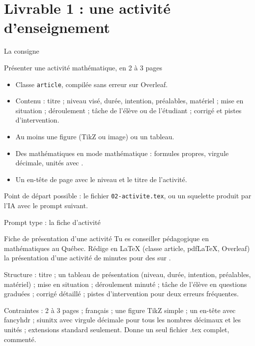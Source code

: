\section{Livrable 1 : une activité d'enseignement}

\begin{frame}{La consigne}
  \begin{Exercice}{Présenter une activité mathématique, en 2 à 3 pages}
    \small
    \begin{itemize}
      \item Classe \texttt{article}, compilée sans erreur sur Overleaf.
      \item Contenu : titre ; niveau visé, durée, intention, préalables,
        matériel ; mise en situation ; déroulement ; tâche de l'élève ou de l'étudiant ;
        corrigé et pistes d'intervention.
      \item Au moins une figure (TikZ ou image) ou un tableau.
      \item Des mathématiques en mode mathématique : formules propres,
        virgule décimale, unités avec .
      \item Un en-tête de page avec le niveau et le titre de l'activité.
    \end{itemize}
  \end{Exercice}
  \small Point de départ possible : le fichier \texttt{02-activite.tex},
  ou un squelette produit par l'IA avec le prompt suivant.
\end{frame}

\begin{frame}{Prompt type : la fiche d'activité}
  \begin{Prompt}{Fiche de présentation d'une activité}
    \footnotesize Tu es conseiller pédagogique en mathématiques
     au Québec. Rédige en LaTeX (classe article, pdfLaTeX,
    Overleaf) la présentation d'une activité de  minutes pour
    des  sur .

    Structure : titre ; un tableau de présentation (niveau, durée,
    intention, préalables, matériel) ; mise en situation ; déroulement
    minuté ; tâche de l'élève en  questions graduées ; corrigé
    détaillé ; pistes d'intervention pour deux erreurs fréquentes.

    Contraintes : 2 à 3 pages ; français ; une figure TikZ simple ; un
    en-tête avec fancyhdr ; siunitx avec virgule décimale pour tous les
    nombres décimaux et les unités ; extensions standard seulement.
    Donne un seul fichier .tex complet, commenté.
  \end{Prompt}
\end{frame}

